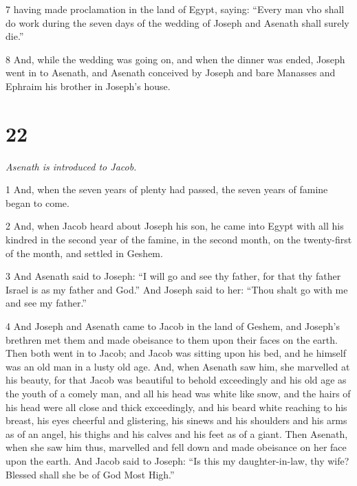 \par 7 having made proclamation in the land of Egypt, saying:  “Every man vho shall do work during the seven days of the wedding of Joseph and Asenath shall surely die.” 

\par 8 And, while the wedding was going on, and when the dinner was ended, Joseph went in to Asenath, and Asenath conceived by Joseph and bare Manasses and Ephraim his brother in Joseph's house.

\chapter{22}

\par \textit{Asenath is introduced to Jacob.}


\par 1 And, when the seven years of plenty had passed, the seven years of famine began to come. 

\par 2 And, when Jacob heard about Joseph his son, he came into Egypt with all his kindred in the second year of the famine, in the second month, on the twenty-first of the month, and settled in Geshem. 

\par 3 And Asenath said to Joseph: “I will go and see thy father, for that thy father Israel is as my father and God.” And Joseph said to her: “Thou shalt go with me and see my father.” 

\par 4 And Joseph and Asenath came to Jacob in the land of Geshem, and Joseph's brethren met them and made obeisance to them upon their faces on the earth. Then both went in to Jacob; and Jacob was sitting upon his bed, and he himself was an old man in a lusty old age. And, when Asenath saw him, she marvelled at his beauty, for that Jacob was beautiful to behold exceedingly and his old age as the youth of a comely man, and all his head was white like snow, and the hairs of his head were all close and thick exceedingly, and his beard white reaching to his breast, his eyes cheerful and glistering, his sinews and his shoulders and his arms as of an angel, his thighs and his calves and his feet as of a giant. Then Asenath, when she saw him thus, marvelled and fell down and made obeisance on her face upon the earth. And Jacob said to Joseph: “Is this my daughter-in-law, thy wife? Blessed shall she be of God Most High.” 

